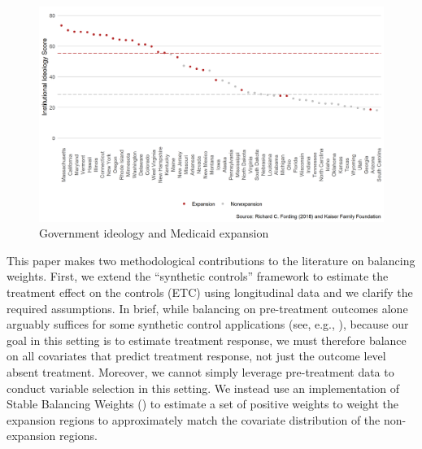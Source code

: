 \documentclass{article}
\begin{document}
\begin{figure}
    \begin{center}
    \caption{Government ideology and Medicaid expansion}
    \label{fig:stateideology}
    \includegraphics[scale=0.6]{01_Plots/political-expansion-plot.png}
    \end{center}
\end{figure}

This paper makes two methodological contributions to the literature on balancing weights. First, we extend the ``synthetic controls'' framework to estimate the treatment effect on the controls (ETC) using longitudinal data and we clarify the required assumptions. In brief, while balancing on pre-treatment outcomes alone arguably suffices for some synthetic control applications (see, e.g., \cite{botosaru2017role}), because our goal in this setting is to estimate treatment response, we must therefore balance on all covariates that predict treatment response, not just the outcome level absent treatment. Moreover, we cannot simply leverage pre-treatment data to conduct variable selection in this setting. We instead use an implementation of Stable Balancing Weights (\cite{zubizarreta2015stable}) to estimate a set of positive weights to weight the expansion regions to approximately match the covariate distribution of the non-expansion regions. 
\end{document}
